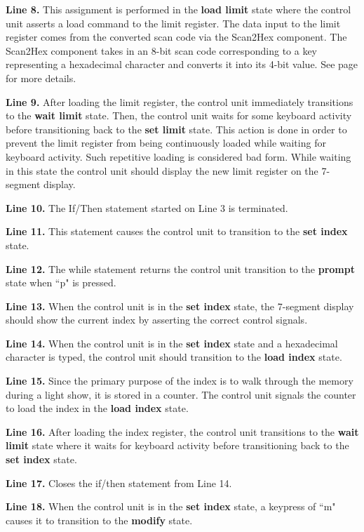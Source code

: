 \textbf{ Line 8.} This assignment is performed in the \textbf{ load limit} state where the control
unit asserts a load command to the limit register.  The data input to the limit
register comes from the converted scan code via the Scan2Hex component.  The Scan2Hex
component takes in an 8-bit scan code corresponding to a key representing a hexadecimal
character and converts it into its 4-bit value. See page \pageref{page:ScanDecode}
for more details.

\textbf{ Line 9.}  After loading the limit register, the control unit immediately transitions
to the \textbf{ wait limit} state.  Then, the control unit waits for some keyboard activity
before transitioning back to the \textbf{ set limit} state.  This action is done in order to prevent
the limit register from being continuously loaded while waiting for keyboard activity.
Such repetitive loading is considered bad form.  While waiting in this state the control
unit should display the new limit register on the 7-segment display.

\textbf{ Line 10.} The If/Then statement started on Line 3 is terminated.

\textbf{ Line 11.} This statement causes the control unit to transition to the \textbf{ set index}
state.

\textbf{ Line 12.} The while statement returns the control unit transition to the \textbf{ prompt} state when
``p" is pressed.

\textbf{ Line 13.} When the control unit is in the \textbf{ set index} state, the 7-segment display
should show the current index by asserting the correct control signals.

\textbf{ Line 14.} When the control unit is in the \textbf{ set index} state and a hexadecimal
character is typed, the control unit should transition to the \textbf{ load index} state.

\textbf{ Line 15.} Since the primary purpose of the index is to walk through the memory
during a light show, it is stored in a counter.  The control unit signals the
counter to load the index in the \textbf{ load index} state.

\textbf{ Line 16.} After loading the index register, the control unit transitions to the \textbf{ wait
limit} state where it waits for keyboard activity before transitioning back
to the \textbf{ set index} state.

\textbf{ Line 17.} Closes the if/then statement from Line 14.

\textbf{ Line 18.} When the control unit is in the \textbf{ set index} state, a keypress of ``m"
causes it to transition to the \textbf{ modify} state.

